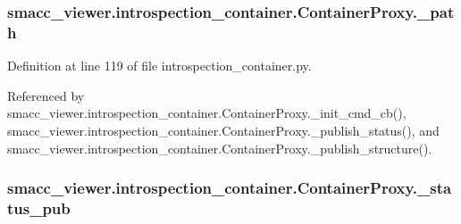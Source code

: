 \subsubsection[{\texorpdfstring{\+\_\+path}{_path}}]{\setlength{\rightskip}{0pt plus 5cm}smacc\+\_\+viewer.\+introspection\+\_\+container.\+Container\+Proxy.\+\_\+path\hspace{0.3cm}{\ttfamily [private]}}\hypertarget{classsmacc__viewer_1_1introspection__container_1_1ContainerProxy_a1196c9f62c5bf656de0dddba97f57884}{}\label{classsmacc__viewer_1_1introspection__container_1_1ContainerProxy_a1196c9f62c5bf656de0dddba97f57884}


Definition at line 119 of file introspection\+\_\+container.\+py.



Referenced by smacc\+\_\+viewer.\+introspection\+\_\+container.\+Container\+Proxy.\+\_\+init\+\_\+cmd\+\_\+cb(), smacc\+\_\+viewer.\+introspection\+\_\+container.\+Container\+Proxy.\+\_\+publish\+\_\+status(), and smacc\+\_\+viewer.\+introspection\+\_\+container.\+Container\+Proxy.\+\_\+publish\+\_\+structure().

\subsubsection[{\texorpdfstring{\+\_\+status\+\_\+pub}{_status_pub}}]{\setlength{\rightskip}{0pt plus 5cm}smacc\+\_\+viewer.\+introspection\+\_\+container.\+Container\+Proxy.\+\_\+status\+\_\+pub\hspace{0.3cm}{\ttfamily [private]}}\hypertarget{classsmacc__viewer_1_1introspection__container_1_1ContainerProxy_ac1f04f2ed4690fc523f493f046b45429}{}\label{classsmacc__viewer_1_1introspection__container_1_1ContainerProxy_ac1f04f2ed4690fc523f493f046b45429}


